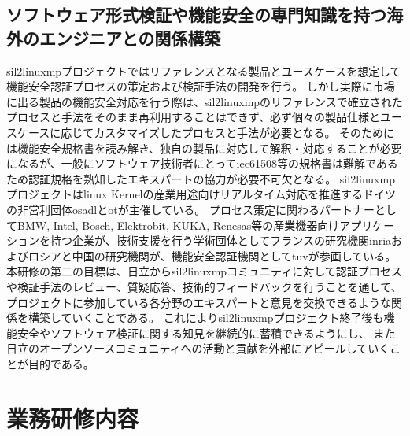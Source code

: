 \section{ソフトウェア形式検証や機能安全の専門知識を持つ海外のエンジニアとの関係構築}
\acrshort{sil2linuxmp}プロジェクトではリファレンスとなる製品とユースケースを想定して機能安全認証プロセスの策定および検証手法の開発を行う。
しかし実際に市場に出る製品の機能安全対応を行う際は、\acrshort{sil2linuxmp}のリファレンスで確立されたプロセスと手法をそのまま再利用することはできず、必ず個々の製品仕様とユースケースに応じてカスタマイズしたプロセスと手法が必要となる。
そのためには機能安全規格書を読み解き、独自の製品に対応して解釈・対応することが必要になるが、一般にソフトウェア技術者にとって\acrshort{iec61508}等の規格書は難解であるため認証規格を熟知したエキスパートの協力が必要不可欠となる。
\acrshort{sil2linuxmp}プロジェクトは\acrshort{linux} Kernelの産業用途向けリアルタイム対応を推進するドイツの非営利団体\gls{osadl}と\acrshort{ot}が主催している。
プロセス策定に関わるパートナーとしてBMW, Intel, Bosch, Elektrobit, KUKA, Renesas等の産業機器向けアプリケーションを持つ企業が、技術支援を行う学術団体としてフランスの研究機関\acrshort{inria}およびロシアと中国の研究機関が、機能安全認証機関として\acrshort{tuv}が参画している。
本研修の第二の目標は、日立から\acrshort{sil2linuxmp}コミュニティに対して認証プロセスや検証手法のレビュー、質疑応答、技術的フィードバックを行うことを通して、プロジェクトに参加している各分野のエキスパートと意見を交換できるような関係を構築していくことである。
これにより\acrshort{sil2linuxmp}プロジェクト終了後も機能安全やソフトウェア検証に関する知見を継続的に蓄積できるようにし、
また日立のオープンソースコミュニティへの活動と貢献を外部にアピールしていくことが目的である。
\chapter{業務研修内容}
